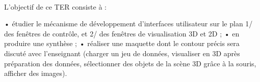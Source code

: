 \paragraph{}
L'objectif de ce TER consiste à :

• étudier le mécanisme de développement d'interfaces utilisateur sur le plan 1/ des fenêtres de
contrôle, et 2/ des fenêtres de visualisation 3D et 2D ;
• en produire une synthèse ;
• réaliser une maquette dont le contour précis sera discuté avec l'enseignant (charger un jeu de
données, visualiser en 3D après préparation des données, sélectionner des objets de la scène
3D grâce à la souris, afficher des images).

\newpage